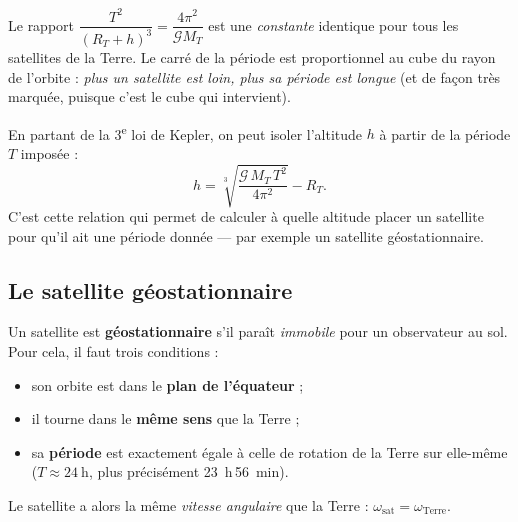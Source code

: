 \documentclass[11pt,a4paper]{article}
\newcommand{\Grav}{\mathcal{G}}        %
\begin{document}
\begin{theoreme}
Le rapport $\dfrac{T^2}{(R_T+h)^3}=\dfrac{4\pi^2}{\Grav M_T}$ est une \emph{constante}
identique pour tous les satellites de la Terre. Le carré de la période est
proportionnel au cube du rayon de l'orbite : \emph{plus un satellite est loin, plus sa
période est longue} (et de façon très marquée, puisque c'est le cube qui intervient).
\end{theoreme}

\begin{remarque}
En partant de la 3\textsuperscript{e} loi de Kepler, on peut isoler l'altitude $h$ à
partir de la période $T$ imposée :
\[
h=\sqrt[3]{\dfrac{\Grav\,M_T\,T^2}{4\pi^2}}-R_T .
\]
C'est cette relation qui permet de calculer à quelle altitude placer un satellite pour
qu'il ait une période donnée — par exemple un satellite géostationnaire.
\end{remarque}

\subsection{Le satellite géostationnaire}

\begin{definition}
Un satellite est \textbf{géostationnaire} s'il paraît \emph{immobile} pour un
observateur au sol. Pour cela, il faut trois conditions :
\begin{itemize}[leftmargin=1.6em,topsep=2pt,itemsep=1pt]
  \item son orbite est dans le \textbf{plan de l'équateur} ;
  \item il tourne dans le \textbf{même sens} que la Terre ;
  \item sa \textbf{période} est exactement égale à celle de rotation de la Terre sur
        elle-même ($T\approx\SI{24}{\hour}$, plus précisément \SI{23}{\hour}\,\SI{56}{\minute}).
\end{itemize}
Le satellite a alors la même \emph{vitesse angulaire} que la Terre :
$\omega_{\text{sat}}=\omega_{\text{Terre}}$.
\end{definition}
\end{document}
